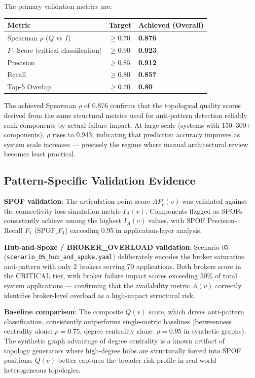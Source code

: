\documentclass[11pt]{article}
\begin{document}
The primary validation metrics are:

\begin{center}
\begin{tabular}{@{}lll@{}}
\toprule
\textbf{Metric} & \textbf{Target} & \textbf{Achieved (Overall)} \\
\midrule
Spearman $\rho$ ($Q$ vs $I$) & $\ge 0.70$ & \textbf{0.876} \\
$F_1$-Score (critical classification) & $\ge 0.90$ & \textbf{0.923} \\
Precision & $\ge 0.85$ & \textbf{0.912} \\
Recall & $\ge 0.80$ & \textbf{0.857} \\
Top-5 Overlap & $\ge 0.70$ & \textbf{0.80} \\
\bottomrule
\end{tabular}
\end{center}

The achieved Spearman $\rho$ of 0.876 confirms that the topological quality scores derived from the same structural metrics used for anti-pattern detection reliably rank components by actual failure impact. At large scale (systems with 150--300+ components), $\rho$ rises to 0.943, indicating that prediction accuracy improves as system scale increases --- precisely the regime where manual architectural review becomes least practical.

\subsection{Pattern-Specific Validation Evidence}

\textbf{SPOF validation}: The articulation point score $AP_c(v)$ was validated against the connectivity-loss simulation metric $I_A(v)$. Components flagged as SPOFs consistently achieve among the highest $I_A(v)$ values, with SPOF Precision-Recall $F_1$ ($\mathrm{SPOF}\_F_1$) exceeding 0.95 in application-layer analysis.

\textbf{Hub-and-Spoke / BROKER\_OVERLOAD validation}: Scenario 05 (\texttt{scenario\_05\_hub\_and\_spoke.yaml}) deliberately encodes the broker saturation anti-pattern with only 2 brokers serving 70 applications. Both brokers score in the CRITICAL tier, with broker failure impact scores exceeding 50\% of total system applications --- confirming that the availability metric $A(v)$ correctly identifies broker-level overload as a high-impact structural risk.

\textbf{Baseline comparison}: The composite $Q(v)$ score, which drives anti-pattern classification, consistently outperforms single-metric baselines (betweenness centrality alone: $\rho = 0.75$, degree centrality alone: $\rho = 0.95$ in synthetic graphs). The synthetic graph advantage of degree centrality is a known artifact of topology generators where high-degree hubs are structurally forced into SPOF positions; $Q(v)$ better captures the broader risk profile in real-world heterogeneous topologies.
\end{document}
